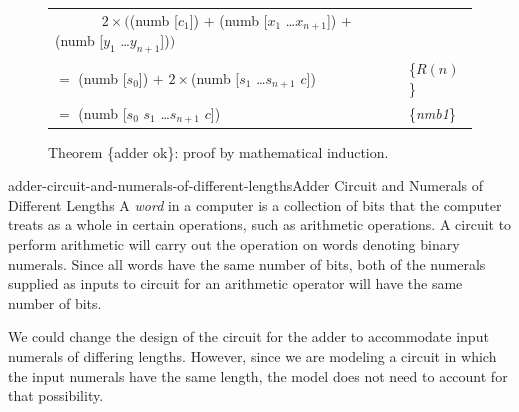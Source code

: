 \begin{figure}
\begin{center}
\begin{tabular}{ll}
 ~~~~~~ $2\times($\textsf{(numb [$c_1$])} $+$ \textsf{(numb [$x_1$ \dots $x_{n+1}$])} $+$ \textsf{(numb [$y_1$ \dots $y_{n+1}$])}$)$ & \\
$=$ \textsf{(numb [$s_0$])} $+$ $2\times$\textsf{(numb [$s_1$ \dots $s_{n+1}$ $c$])}                                        & \{$R(n)$\} \\
$=$ \textsf{(numb [$s_0$ $s_1$ \dots $s_{n+1}$ $c$])}                                                              & \{\emph{nmb1}\} \\
\end{tabular}
\end{center}
\caption{Theorem \{adder ok\}: proof by mathematical induction.}
\label{fig:adder-thm-prf}
\end{figure}

\begin{exercises}


\end{exercises}

\begin{aside}{adder-circuit-and-numerals-of-different-lengths}{Adder Circuit and Numerals of Different Lengths}
A \emph{word} in a computer is a collection of bits
that the computer treats as a whole in certain operations,
such as arithmetic operations.
A circuit to perform arithmetic will carry out
the operation on words denoting binary numerals.
Since all words have the same number of bits,
both of the numerals supplied as inputs to circuit
for an arithmetic operator will have the same number of bits.

We could change the design of the circuit for the adder
to accommodate input numerals of differing lengths.
However, since we are modeling a circuit
in which the input numerals have the same length,
the model does not need to account for that
possibility.
\end{aside}

